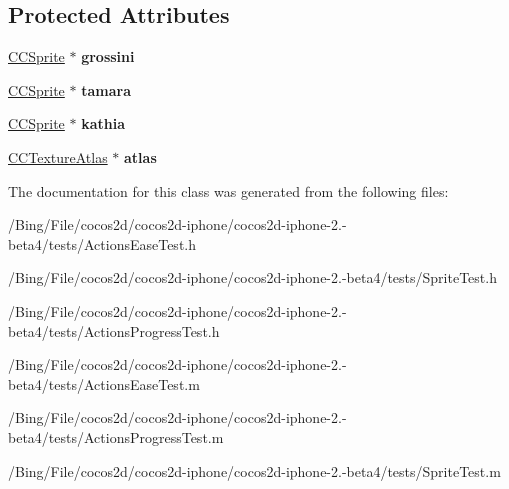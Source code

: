 \subsection*{Protected Attributes}
\begin{DoxyCompactItemize}
\item 
\hypertarget{interface_sprite_demo_ac320355b16d9cca8f44703d158be462b}{\hyperlink{class_c_c_sprite}{C\-C\-Sprite} $\ast$ {\bfseries grossini}}\label{interface_sprite_demo_ac320355b16d9cca8f44703d158be462b}

\item 
\hypertarget{interface_sprite_demo_a5c499bee8ca73cb4a50c8a211e5a49b9}{\hyperlink{class_c_c_sprite}{C\-C\-Sprite} $\ast$ {\bfseries tamara}}\label{interface_sprite_demo_a5c499bee8ca73cb4a50c8a211e5a49b9}

\item 
\hypertarget{interface_sprite_demo_afa3af13dacee0eafc479cdafd6ef0f4c}{\hyperlink{class_c_c_sprite}{C\-C\-Sprite} $\ast$ {\bfseries kathia}}\label{interface_sprite_demo_afa3af13dacee0eafc479cdafd6ef0f4c}

\item 
\hypertarget{interface_sprite_demo_afa490d823179474ec92db51c1aae132f}{\hyperlink{interface_c_c_texture_atlas}{C\-C\-Texture\-Atlas} $\ast$ {\bfseries atlas}}\label{interface_sprite_demo_afa490d823179474ec92db51c1aae132f}

\end{DoxyCompactItemize}


The documentation for this class was generated from the following files\-:\begin{DoxyCompactItemize}
\item 
/\-Bing/\-File/cocos2d/cocos2d-\/iphone/cocos2d-\/iphone-\/2.-\/beta4/tests/Actions\-Ease\-Test.\-h\item 
/\-Bing/\-File/cocos2d/cocos2d-\/iphone/cocos2d-\/iphone-\/2.-\/beta4/tests/Sprite\-Test.\-h\item 
/\-Bing/\-File/cocos2d/cocos2d-\/iphone/cocos2d-\/iphone-\/2.-\/beta4/tests/Actions\-Progress\-Test.\-h\item 
/\-Bing/\-File/cocos2d/cocos2d-\/iphone/cocos2d-\/iphone-\/2.-\/beta4/tests/Actions\-Ease\-Test.\-m\item 
/\-Bing/\-File/cocos2d/cocos2d-\/iphone/cocos2d-\/iphone-\/2.-\/beta4/tests/Actions\-Progress\-Test.\-m\item 
/\-Bing/\-File/cocos2d/cocos2d-\/iphone/cocos2d-\/iphone-\/2.-\/beta4/tests/Sprite\-Test.\-m\end{DoxyCompactItemize}
